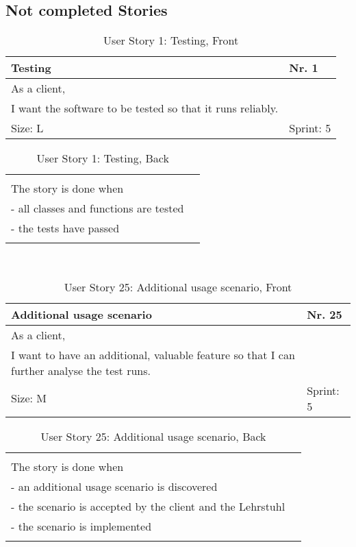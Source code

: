 \subsection*{Not completed Stories}

\begin{table}[H]
  \caption{User Story 1: Testing, Front}
  \label{Story_1_Front}
  \centering
  \begin{tabular}{|p{9cm} p{2cm}|}
	\hline  	
  	Testing & Nr. 1 \\ 
  	\hline
  	As a client, &    \\ 
  	I want the software to be tested so that it runs reliably. &    \\ 
  	Size: L & Sprint: 5 \\ 
  	\hline
  \end{tabular}
\end{table}
\begin{table}[H]
  \caption{User Story 1: Testing, Back}
  \label{Story_1_Back}
  \centering
  \begin{tabular}{|p{10cm} p{1cm}|}
  \hline
  	  &    \\ 
  	The story is done when &    \\ 
  	 - all classes and functions are tested & \\ 
  	 - the tests have passed & \\ 
  	 
  	  &  
  	   \\ 
  	\hline
  \end{tabular}
\end{table} 

\ \\ 

\begin{table}[H]
  \caption{User Story 25: Additional usage scenario, Front}
  \label{Story_25_Front}
  \centering
  \begin{tabular}{|p{9cm} p{2cm}|}
	\hline  	
  	Additional usage scenario & Nr. 25 \\ 
  	\hline
  	As a client, &    \\ 
  	I want to have an additional, valuable feature so that I can further analyse the test runs.  &    \\ 
  	Size: M & Sprint: 5 \\ 
  	\hline
  \end{tabular}
\end{table}
\begin{table}[H]
  \caption{User Story 25: Additional usage scenario, Back}
  \label{Story_25_Back}
  \centering
  \begin{tabular}{|p{10cm} p{1cm}|}
  \hline
  	  &    \\ 
  	The story is done when &    \\ 
  	 - an additional usage scenario is discovered & \\ 
  	 - the scenario is accepted by the client and the Lehrstuhl & \\ 
  	 - the scenario is implemented & \\ 
  	 
  	  &  
  	   \\ 
  	\hline
  \end{tabular}
\end{table}  

